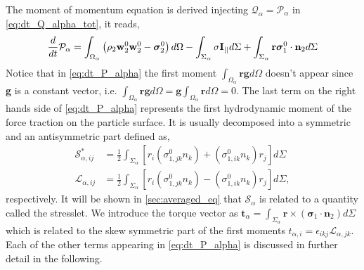 The moment of momentum equation is derived injecting $\mathcal{Q}_\alpha = \mathcal{P}_\alpha$ in \ref{eq:dt_Q_alpha_tot}, it reads, 
\begin{equation}
    \frac{d}{d t} \mathcal{P}_\alpha
    = \int_{\Omega_\alpha} \left(
        \rho_2  \textbf{w}_2^0 \textbf{w}_2^0 
        - \bm{\sigma}_2^0
    \right) d\Omega
    - \int_{\Sigma_\alpha} 
        \sigma \textbf{I}_{||}
    d\Sigma
    + \int_{\Sigma_\alpha} \textbf{r}\bm{\sigma}_1^0\cdot \textbf{n}_2d\Sigma 
    \label{eq:dt_P_alpha}
\end{equation}
Notice that in \ref{eq:dt_P_alpha} the first moment  $\int_{\Omega_\alpha} \textbf{rg} d\Omega$ doesn't appear since \textbf{g} is a constant vector, i.e. $\int_{\Omega_\alpha} \textbf{rg} d\Omega =\textbf{g}\int_{\Omega_\alpha} \textbf{r} d\Omega=0$. 
The last term on the right hands side of \ref{eq:dt_P_alpha} represents the first hydrodynamic moment of the force traction on the particle surface.
It is usually decomposed into a symmetric and an antisymmetric part defined as, 
\begin{align}
    \label{eq:M_decomposition}
    \mathscr{S}_{\alpha,ij}^*
    &= \frac{1}{2}  \int_{\Sigma_\alpha} \left[
        r_i(\sigma_{1,jk}^0 n_k)
        + (\sigma_{1,ik}^0 n_k)r_j
        \right]d\Sigma
    \\
    \mathscr{L}_{\alpha,ij}
    &= \frac{1}{2}  \int_{\Sigma_\alpha} \left[
        r_i(\sigma_{1,jk}^0 n_k)
        - (\sigma_{1,ik}^0 n_k)r_j
    \right]d\Sigma, \nonumber
\end{align}
respectively. 
It will be shown in \ref{sec:averaged_eq} that $\mathscr{S}_\alpha$ is related to a quantity called the stresslet. 
We introduce the torque vector as $\textbf{t}_\alpha = \int_{\Sigma_\alpha} \textbf{r} \times (\bm{\sigma}_1\cdot \textbf{n}_2) d\Sigma$ which is related to the skew symmetric part of the first moments $t_{\alpha,i} = \epsilon_{ikj} \mathscr{L}_{\alpha,jk}$. 
Each of the other terms appearing in \ref{eq:dt_P_alpha} is discussed in further detail in the following.
 

